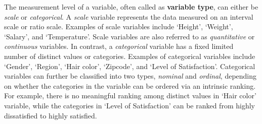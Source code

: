 The measurement level of a variable, often called as {\bf variable type}, can either be
\emph{scale} or \emph{categorical}.  A \emph{scale} variable represents the data measured on
an interval scale or ratio scale.  Examples of scale variables include `Height', `Weight',
`Salary', and `Temperature'.  Scale variables are also referred to as \emph{quantitative}
or \emph{continuous} variables.  In contrast, a \emph{categorical} variable has a fixed
limited number of distinct values or categories.  Examples of categorical variables
include `Gender', `Region', `Hair color', `Zipcode', and `Level of Satisfaction'.
Categorical variables can further be classified into two types, \emph{nominal} and
\emph{ordinal}, depending on whether the categories in the variable can be ordered via an
intrinsic ranking.  For example, there is no meaningful ranking among distinct values in
`Hair color' variable, while the categories in `Level of Satisfaction' can be ranked from
highly dissatisfied to highly satisfied.

